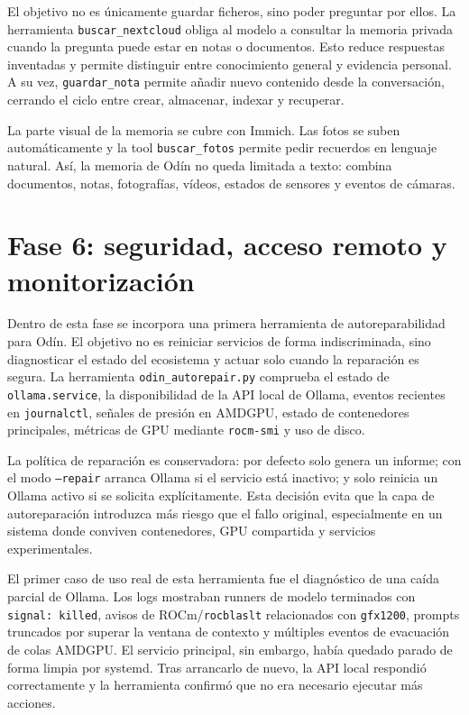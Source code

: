 El objetivo no es únicamente guardar ficheros, sino poder preguntar por ellos. La herramienta \texttt{buscar\_nextcloud} obliga al modelo a consultar la memoria privada cuando la pregunta puede estar en notas o documentos. Esto reduce respuestas inventadas y permite distinguir entre conocimiento general y evidencia personal. A su vez, \texttt{guardar\_nota} permite añadir nuevo contenido desde la conversación, cerrando el ciclo entre crear, almacenar, indexar y recuperar.

La parte visual de la memoria se cubre con Immich. Las fotos se suben automáticamente y la tool \texttt{buscar\_fotos} permite pedir recuerdos en lenguaje natural. Así, la memoria de Odín no queda limitada a texto: combina documentos, notas, fotografías, vídeos, estados de sensores y eventos de cámaras.

\section{Fase 6: seguridad, acceso remoto y monitorización}
Dentro de esta fase se incorpora una primera herramienta de autoreparabilidad para Odín. El objetivo no es reiniciar servicios de forma indiscriminada, sino diagnosticar el estado del ecosistema y actuar solo cuando la reparación es segura. La herramienta \texttt{odin\_autorepair.py} comprueba el estado de \texttt{ollama.service}, la disponibilidad de la API local de Ollama, eventos recientes en \texttt{journalctl}, señales de presión en AMDGPU, estado de contenedores principales, métricas de GPU mediante \texttt{rocm-smi} y uso de disco.

La política de reparación es conservadora: por defecto solo genera un informe; con el modo \texttt{--repair} arranca Ollama si el servicio está inactivo; y solo reinicia un Ollama activo si se solicita explícitamente. Esta decisión evita que la capa de autoreparación introduzca más riesgo que el fallo original, especialmente en un sistema donde conviven contenedores, GPU compartida y servicios experimentales.

El primer caso de uso real de esta herramienta fue el diagnóstico de una caída parcial de Ollama. Los logs mostraban runners de modelo terminados con \texttt{signal: killed}, avisos de ROCm/\texttt{rocblaslt} relacionados con \texttt{gfx1200}, prompts truncados por superar la ventana de contexto y múltiples eventos de evacuación de colas AMDGPU. El servicio principal, sin embargo, había quedado parado de forma limpia por systemd. Tras arrancarlo de nuevo, la API local respondió correctamente y la herramienta confirmó que no era necesario ejecutar más acciones.

